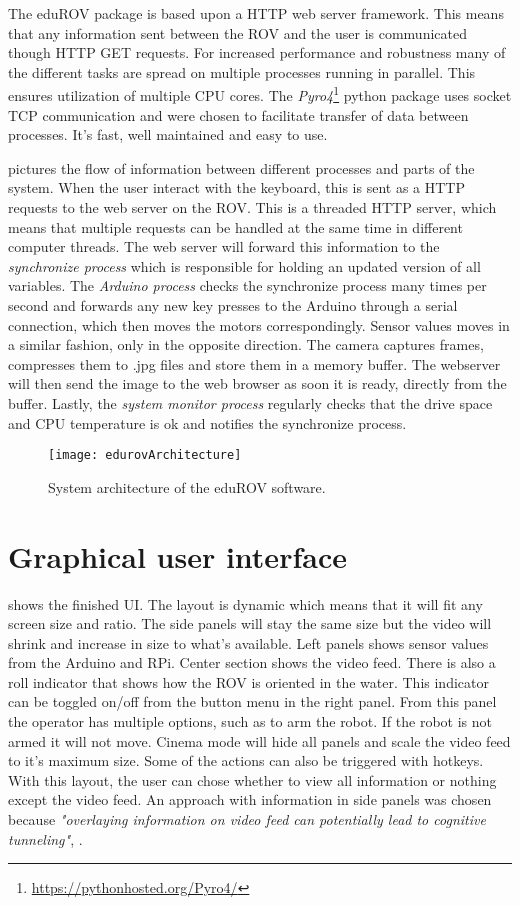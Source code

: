The eduROV package is based upon a HTTP web server framework. This means that any information sent between the ROV and the user is communicated though HTTP GET requests. For increased performance and robustness many of the different tasks are spread on multiple processes running in parallel. This ensures utilization of multiple CPU cores. The \emph{Pyro4}\footnote{\url{https://pythonhosted.org/Pyro4/}} python package uses socket TCP communication and were chosen to facilitate transfer of data between processes. It's fast, well maintained and easy to use.

 pictures the flow of information between different processes and parts of the system. When the user interact with the keyboard, this is sent as a HTTP requests to the web server on the ROV. This is a threaded HTTP server, which means that multiple requests can be handled at the same time in different computer threads. The web server will forward this information to the \textit{synchronize process} which is responsible for holding an updated version of all variables. The \textit{Arduino process} checks the synchronize process many times per second and forwards any new key presses to the Arduino through a serial connection, which then moves the motors correspondingly. Sensor values moves in a similar fashion, only in the opposite direction. The camera captures frames, compresses them to .jpg files and store them in a memory buffer. The webserver will then send the image to the web browser as soon it is ready, directly from the buffer. Lastly, the \textit{system monitor process} regularly checks that the drive space and CPU temperature is ok and notifies the synchronize process.


\begin{figure}[h!]
    \centering
    \texttt{[image: edurovArchitecture]}
    \caption{System architecture of the eduROV software.}
    \label{edurovArchitecture}
\end{figure}

\section{Graphical user interface}

 shows the finished UI. The layout is dynamic which means that it will fit any screen size and ratio. The side panels will stay the same size but the video will shrink and increase in size to what's available. Left panels shows sensor values from the Arduino and RPi. Center section shows the video feed. There is also a roll indicator that shows how the ROV is oriented in the water. This indicator can be toggled on/off from the button menu in the right panel. From this panel the operator has multiple options, such as to arm the robot. If the robot is not armed it will not move. Cinema mode will hide all panels and scale the video feed to it's maximum size. Some of the actions can also be triggered with hotkeys. With this layout, the user can chose whether to view all information or nothing except the video feed. An approach with information in side panels was chosen because \textit{"overlaying information on video feed can potentially lead to cognitive tunneling"}, \citep{Chen2007}.

